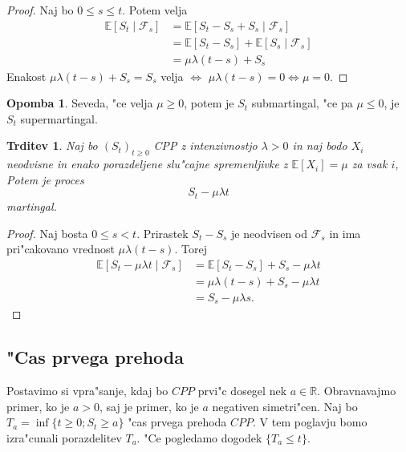 \documentclass[12pt, a4paper, reqno]{amsart}
\theoremstyle{definition} %
\newtheorem{opomba}[definicija]{Opomba}
\theoremstyle{plain} %
\newtheorem{trditev}[definicija]{Trditev}
\newcommand{\R}{\mathbb{R}}
\newcommand{\E}{\mathbb{E}}
\newcommand{\F}{\mathcal{F}}
\newcommand{\1}{\mathds{1}}
\begin{document}
        \begin{proof}
            Naj bo $0\leq s\leq t$. Potem velja
            \begin{align*}
                \E\left[S_t\mid\F_s\right] 
                        &= \E\left[S_t - S_s + S_s\mid \F_s\right] \\
                        &= \E\left[S_t - S_s\right] + \E\left[S_s\mid \F_s\right] \\
                        &= \mu\lambda(t-s) + S_s
            \end{align*}
           Enakost $\mu\lambda(t-s) + S_s = S_s$ velja $\iff$ $\mu\lambda(t-s) = 0 \iff \mu = 0$.
        \end{proof}

        \begin{opomba}
            Seveda, "ce velja $\mu \geq 0$, potem je $S_t$ submartingal, "ce pa $\mu \leq 0$, je
            $S_t$ supermartingal.
        \end{opomba}

        \begin{trditev}
            Naj bo $(S_t)_{t\geq0}$ CPP z intenzivnostjo $\lambda > 0$ in naj bodo $X_i$ neodvisne
            in enako porazdeljene slu"cajne spremenljivke z $\E\left[X_i\right] = \mu$ za vsak $i$,
            Potem je proces 
            $$
                S_t - \mu\lambda t
            $$
            martingal.
            \label{trd:CPPpostanemartingal}
        \end{trditev}

        \begin{proof}
            Naj bosta $0 \leq s < t$. Prirastek $S_t - S_s$ je neodvisen od $\F_s$ in ima 
            pri"cakovano vrednost $\mu\lambda(t-s)$. Torej 
            \begin{align*}
                \E\left[S_t - \mu\lambda t\mid\F_s\right] 
                        &= \E\left[S_t - S_s\right] + S_s - \mu\lambda t\\
                        &= \mu\lambda(t-s) + S_s - \mu\lambda t\\
                        &= S_s - \mu\lambda s.
            \end{align*}
        \end{proof}

        \subsection{"Cas prvega prehoda}
        Postavimo si vpra"sanje, kdaj bo $CPP$ prvi"c dosegel nek $a\in\R$. Obravnavajmo primer, ko je 
        $a>0$, saj je primer, ko je $a$ negativen simetri"cen. Naj bo $T_a = \inf\{t\geq0; S_t \geq a\}$ 
        "cas prvega prehoda $CPP$. V tem poglavju bomo izra"cunali porazdelitev $T_a$.
        "Ce pogledamo dogodek $\{T_a \leq t\}$.
\end{document}
